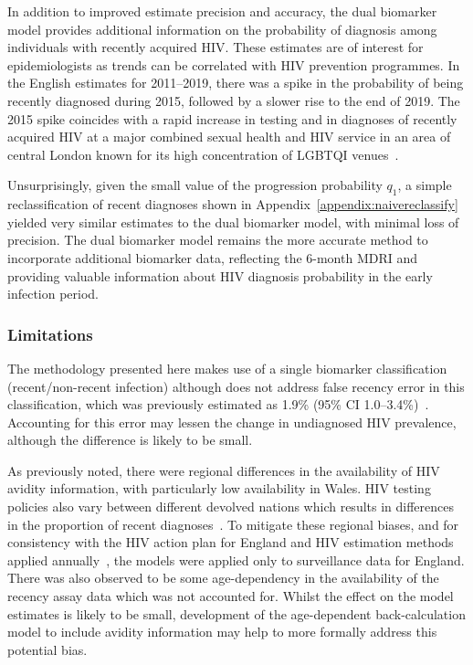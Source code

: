 In addition to improved estimate precision and accuracy, the dual biomarker model provides additional information on the probability of diagnosis among individuals with recently acquired HIV\@. These estimates are of interest for epidemiologists as trends can be correlated with HIV prevention programmes. In the English estimates for 2011--2019, there was a spike in the probability of being recently diagnosed during 2015, followed by a slower rise to the end of 2019. The 2015 spike coincides with a rapid increase in testing and in diagnoses of recently acquired HIV at a major combined sexual health and HIV service in an area of central London known for its high concentration of LGBTQI venues~\parencite{Girometti2021-cp}.

Unsurprisingly, given the small value of the progression probability $q_1$, a simple reclassification of recent diagnoses shown in Appendix~\ref{appendix:naivereclassify} yielded very similar estimates to the dual biomarker model, with minimal loss of precision. The dual biomarker model remains the more accurate method to incorporate additional biomarker data, reflecting the 6-month MDRI and providing valuable information about HIV diagnosis probability in the early infection period.

\subsubsection{Limitations}

The methodology presented here makes use of a single biomarker classification (recent/non-recent infection) although does not address false recency error in this classification, which was previously estimated as 1.9\% (95\% CI 1.0--3.4\%)~\parencite{Aghaizu2018-kk}. Accounting for this error may lessen the change in undiagnosed HIV prevalence, although the difference is likely to be small.

As previously noted, there were regional differences in the availability of HIV avidity information, with particularly low availability in Wales. HIV testing policies also vary between different devolved nations which results in differences in the proportion of recent diagnoses~\parencite{Kirwan2022-za}. To mitigate these regional biases, and for consistency with the HIV action plan for England and HIV estimation methods applied annually~\parencite{Department-of-Health-and-Social-Care2021-ee, Martin2023-um}, the models were applied only to surveillance data for England. There was also observed to be some age-dependency in the availability of the recency assay data which was not accounted for. Whilst the effect on the model estimates is likely to be small, development of the age-dependent back-calculation model to include avidity information may help to more formally address this potential bias.

